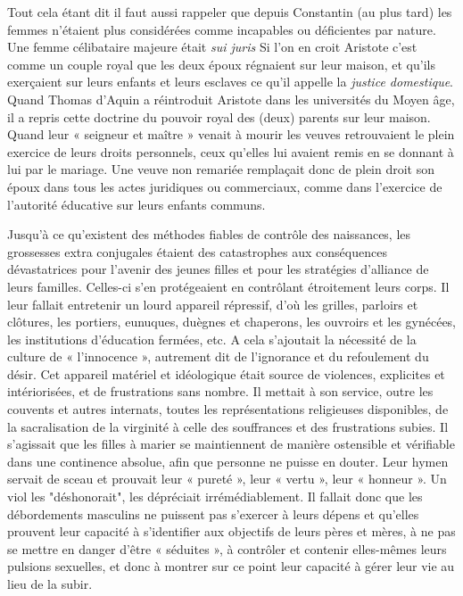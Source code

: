 Tout cela étant dit il faut aussi rappeler que depuis Constantin (au plus tard) les femmes n'étaient plus considérées comme incapables ou déficientes par nature. Une femme célibataire majeure était \emph{sui juris} Si l'on en croit Aristote c'est comme un couple royal que les deux époux régnaient sur leur maison, et qu'ils exerçaient sur leurs enfants et leurs esclaves ce qu'il appelle la \emph{justice domestique}. Quand Thomas d'Aquin a réintroduit Aristote dans les universités du Moyen âge, il a repris cette doctrine du pouvoir royal des (deux) parents sur leur maison. Quand leur « seigneur et maître » venait à mourir les veuves retrouvaient le plein exercice de leurs droits personnels, ceux qu'elles lui avaient remis en se donnant à lui par le mariage. Une veuve non remariée remplaçait donc de plein droit son époux dans tous les actes juridiques ou commerciaux, comme dans l'exercice de l'autorité éducative sur leurs enfants communs.  

 
 Jusqu'à ce qu'existent des méthodes fiables de contrôle des naissances, les grossesses extra conjugales étaient des catastrophes aux conséquences dévastatrices pour l'avenir des jeunes filles et pour les stratégies d'alliance de leurs familles. Celles-ci s'en protégeaient en contrôlant étroitement leurs corps. Il leur fallait entretenir un lourd appareil répressif, d'où les grilles, parloirs et clôtures, les portiers, eunuques, duègnes et chaperons, les ouvroirs et les gynécées, les institutions d'éducation fermées, etc. A cela s'ajoutait la nécessité de la culture de « l'innocence », autrement dit de l'ignorance et du refoulement du désir. Cet appareil matériel et idéologique était source de violences, explicites et intériorisées, et de frustrations sans nombre. Il mettait à son service, outre les couvents et autres internats, toutes les représentations religieuses disponibles, de la sacralisation de la virginité à celle des souffrances et des frustrations subies. Il s'agissait que les filles à marier se maintiennent de manière ostensible et vérifiable dans une continence absolue, afin que personne ne puisse en douter. Leur hymen servait de sceau et prouvait leur « pureté », leur « vertu », leur « honneur ». Un viol les "déshonorait", les dépréciait irrémédiablement. Il fallait donc que les débordements masculins ne puissent pas s'exercer à leurs dépens et qu'elles prouvent leur capacité à s'identifier aux objectifs de leurs pères et mères, à ne pas se mettre en danger d'être « séduites », à contrôler et contenir elles-mêmes leurs pulsions sexuelles, et donc à montrer sur ce point leur capacité à gérer leur vie au lieu de la subir. 
 
